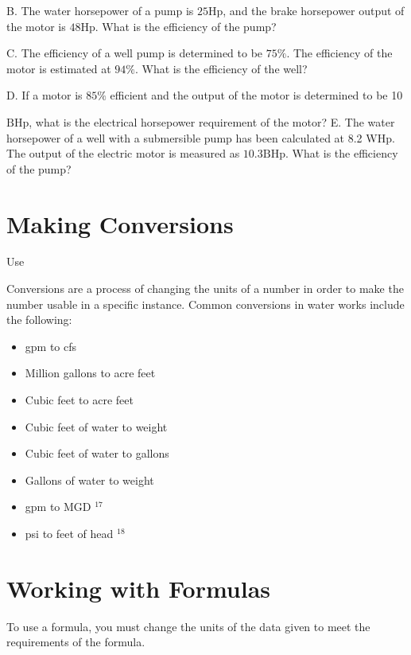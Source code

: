 B. The water horsepower of a pump is $25 \mathrm{Hp}$, and the brake horsepower output of the motor is $48 \mathrm{Hp}$. What is the efficiency of the pump?

C. The efficiency of a well pump is determined to be $75 \%$. The efficiency of the motor is estimated at $94 \%$. What is the efficiency of the well?

D. If a motor is $85 \%$ efficient and the output of the motor is determined to be 10

$\mathrm{BHp}$, what is the electrical horsepower requirement of the motor? E. The water horsepower of a well with a submersible pump has been calculated at 8.2 WHp. The output of the electric motor is measured as $10.3 \mathrm{BHp}$. What is the efficiency of the pump?

\section{Making Conversions}
Use

Conversions are a process of changing the units of a number in order to make the number usable in a specific instance. Common conversions in water works include the following:

\begin{itemize}
  \item gpm to cfs

  \item Million gallons to acre feet

  \item Cubic feet to acre feet

  \item Cubic feet of water to weight

  \item Cubic feet of water to gallons

  \item Gallons of water to weight

  \item gpm to MGD ${ }^{17}$

  \item psi to feet of head ${ }^{18}$

\end{itemize}
\section{Working with Formulas}
To use a formula, you must change the units of the data given to meet the requirements of the formula.

